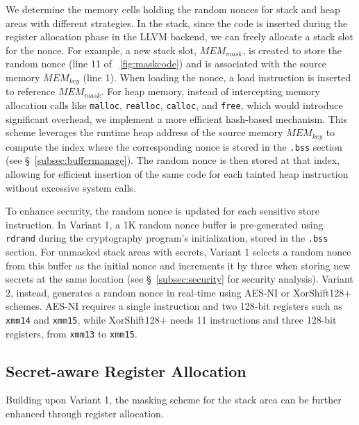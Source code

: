 We determine the memory cells holding the random nonces for stack and heap areas with different strategies.
In the stack, since the code is inserted during the register allocation phase in the LLVM backend, we can freely allocate a stack slot for the nonce. 
For example, a new stack slot, $MEM_{mask}$, is created to store the random nonce (line 11 of \F~\ref{fig:maskcode}) and is associated with the source memory $MEM_{key}$ (line 1). When loading the nonce, a load instruction is inserted to reference $MEM_{mask}$.
For heap memory, instead of intercepting memory allocation calls like \texttt{malloc}, \texttt{realloc}, \texttt{calloc}, and \texttt{free}, which would introduce significant overhead, we implement a more efficient hash-based mechanism. 
This scheme leverages the runtime heap address of the source memory $MEM_{key}$ to compute the index where the corresponding nonce is stored in the \texttt{.bss} section (see \S~\ref{subsec:buffermanage}). 
The random nonce is then stored at that index, allowing for efficient insertion of the same code for each tainted heap instruction without excessive system calls.

To enhance security, the random nonce is updated for each sensitive store instruction. 
In Variant 1, a 1K random nonce buffer is pre-generated using \texttt{rdrand} during the cryptography program's initialization, stored in the \texttt{.bss} section. 
For unmasked stack areas with secrets, Variant 1 selects a random nonce from this buffer as the initial nonce and increments it by three when storing new secrets at the same location (see \S~\ref{subsec:security} for security analysis). 
Variant 2, instead, generates a random nonce in real-time using AES-NI or XorShift128+ schemes.
AES-NI requires a single instruction and two 128-bit registers such as \texttt{xmm14} and \texttt{xmm15}, while XorShift128+ needs 11 instructions and three 128-bit registers, from \texttt{xmm13} to \texttt{xmm15}.

\subsection{Secret-aware Register Allocation}
\label{subsec:registeralloc}

Building upon Variant 1, the masking scheme for the stack area can be further enhanced through register allocation.

